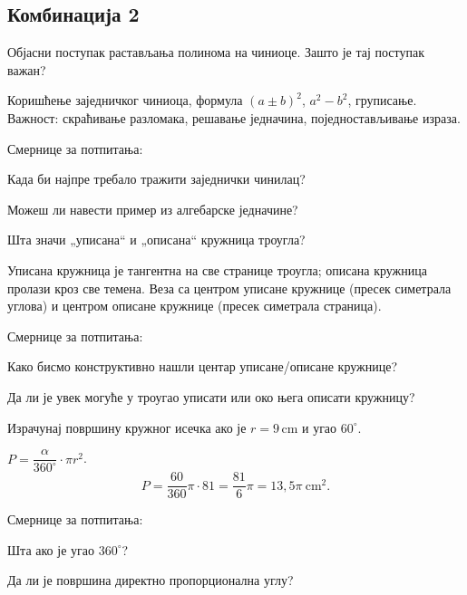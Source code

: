 \documentclass[12pt]{exam}
\begin{document}
\ifprintanswers\newpage\else\fi

\subsection*{Комбинација 2}
\begin{questions}
\question Објасни поступак растављања полинома на чиниоце. Зашто је тај поступак важан?
\begin{solution}
Коришћење заједничког чиниоца, формула $(a\pm b)^2$, $a^2-b^2$, груписање.  
Важност: скраћивање разломака, решавање једначина, поједностављивање израза.

Смернице за потпитања:
  \par Када би најпре требало тражити заједнички чинилац?
  \par Можеш ли навести пример из алгебарске једначине?
\end{solution}

\question Шта значи „уписана“ и „описана“ кружница троугла?
\begin{solution}
Уписана кружница је тангентна на све странице троугла; описана кружница пролази кроз све темена.  
Веза са центром уписане кружнице (пресек симетрала углова) и центром описане кружнице (пресек симетрала страница).

Смернице за потпитања:
  \par Како бисмо конструктивно нашли центар уписане/описане кружнице? 
  \par Да ли је увек могуће у троугао уписати или око њега описати кружницу?
\end{solution}

\question Израчунај површину кружног исечка ако је $r=9\,\mathrm{cm}$ и угао $60^\circ$.
\begin{solution}
$P=\dfrac{\alpha}{360^\circ}\cdot\pi r^2$.
$$
 P = \frac{60}{360}\pi\cdot 81
 = \frac{81}{6}\pi
 = 13{,}5\pi\ \mathrm{cm}^2
.$$

Смернице за потпитања:
  \par Шта ако је угао $360^\circ$? 
  \par Да ли је површина директно пропорционална углу?
\end{solution}
\end{questions}

\ifprintanswers\newpage\else\newpage\fi

\end{document}
